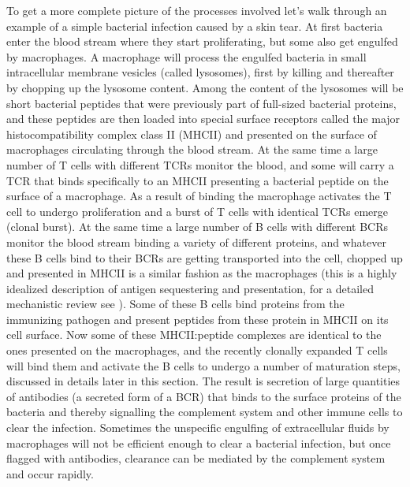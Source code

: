 To get a more complete picture of the processes involved let's walk through an example of a simple bacterial infection caused by a skin tear.
At first bacteria enter the blood stream where they start proliferating, but some also get engulfed by macrophages.
A macrophage will process the engulfed bacteria in small intracellular membrane vesicles (called lysosomes), first by killing and thereafter by chopping up the lysosome content.
Among the content of the lysosomes will be short bacterial peptides that were previously part of full-sized bacterial proteins, and these peptides are then loaded into special surface receptors called the major histocompatibility complex class II (MHCII) and presented on the surface of macrophages circulating through the blood stream.
At the same time a large number of T cells with different TCRs monitor the blood, and some will carry a TCR that binds specifically to an MHCII presenting a bacterial peptide on the surface of a macrophage.
As a result of binding the macrophage activates the T cell to undergo proliferation and a burst of T cells with identical TCRs emerge (clonal burst).
At the same time a large number of B cells with different BCRs monitor the blood stream binding a variety of different proteins, and whatever these B cells bind to their BCRs are getting transported into the cell, chopped up and presented in MHCII is a similar fashion as the macrophages (this is a highly idealized description of antigen sequestering and presentation, for a detailed mechanistic review see \cite{batista2009and}).
Some of these B cells bind proteins from the immunizing pathogen and present peptides from these protein in MHCII on its cell surface.
Now some of these MHCII:peptide complexes are identical to the ones presented on the macrophages, and the recently clonally expanded T cells will bind them and activate the B cells to undergo a number of maturation steps, discussed in details later in this section.
The result is secretion of large quantities of antibodies (a secreted form of a BCR) that binds to the surface proteins of the bacteria and thereby signalling the complement system and other immune cells to clear the infection.
Sometimes the unspecific engulfing of extracellular fluids by macrophages will not be efficient enough to clear a bacterial infection, but once flagged with antibodies, clearance can be mediated by the complement system and occur rapidly.

